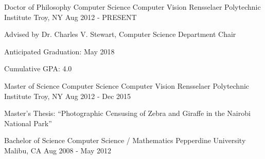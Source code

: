 

\begin{cventries}

  \cventry
    {Doctor of Philosophy \dotSep Computer Science \dotSep Computer Vision} %
    {Rensselaer Polytechnic Institute} %
    {Troy, NY} %
    {Aug 2012 - PRESENT} %
    {
      \begin{cvitems}
        \item{Advised by Dr. Charles V. Stewart, Computer Science Department Chair}
        \item{Anticipated Graduation: May 2018}
        \item{Cumulative GPA: 4.0}
      \end{cvitems}
    }

  \cventry
    {Master of Science \dotSep Computer Science \dotSep Computer Vision} %
    {Rensselaer Polytechnic Institute} %
    {Troy, NY} %
    {Aug 2012 - Dec 2015} %
    {
      \begin{cvitems} %
        \item{Master's Thesis:  ``Photographic Censusing of Zebra and Giraffe in the Nairobi National Park''}
      \end{cvitems}
    }

  \cventryshort
    {Bachelor of Science \dotSep Computer Science / Mathematics} %
    {Pepperdine University} %
    {Malibu, CA} %
    {Aug 2008 - May 2012} %

\end{cventries}

